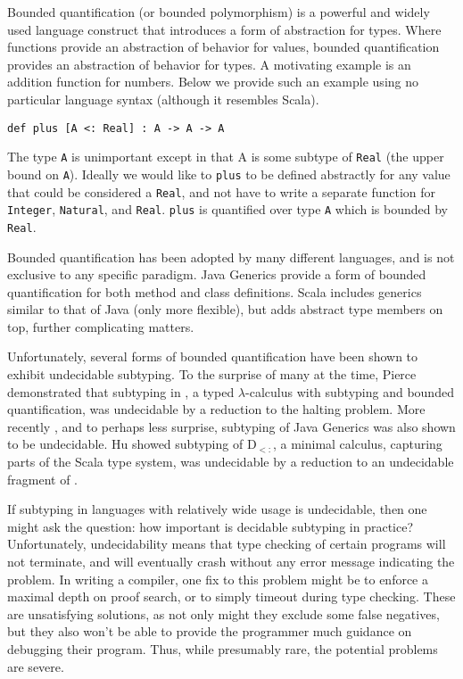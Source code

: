 \documentclass[runningheads]{llncs}
\begin{document}
Bounded quantification (or bounded polymorphism) is a powerful and widely used language construct that introduces a form of 
abstraction for types. Where functions provide an abstraction of behavior for values, bounded quantification 
provides an abstraction of behavior for types. A motivating example is an addition function for numbers. Below we
provide such an example using no particular language syntax (although it resembles Scala).
\begin{lstlisting}[mathescape, style=custom_lang]
def plus [A <: Real] : A -> A -> A
\end{lstlisting}
The type \verb|A| is unimportant except in that A is some subtype of \verb|Real| (the upper bound on \verb|A|). Ideally we would like to 
\verb|plus| to be defined abstractly for any value that could be considered a \verb|Real|, and not have to write 
a separate function for \verb|Integer|, \verb|Natural|, and \verb|Real|. \verb|plus| is  quantified over type \verb|A| which is 
bounded by \verb|Real|.

Bounded quantification has been adopted by many different languages, and is not exclusive to any specific paradigm.
Java Generics provide a form of bounded quantification for both method and class definitions.
Scala includes generics similar to that of Java (only more flexible), but adds abstract type members on top, further complicating matters.

Unfortunately, several forms of bounded quantification have been shown to exhibit undecidable subtyping.
To the surprise of many at the time, Pierce \cite{fsub popl 92} demonstrated that subtyping in \Fsub, a typed $\lambda$-calculus with subtyping and bounded quantification, 
was undecidable by a reduction to the halting problem.
More recently , and to perhaps less surprise, subtyping of Java Generics was also shown to be undecidable.
Hu \cite{jason and andreij} showed subtyping of D$_{<:}$, a minimal calculus, capturing parts of the Scala type system, was undecidable by a reduction to an undecidable fragment of \Fsub.

If subtyping in languages with relatively wide usage is undecidable, then one might ask the question: how important is decidable subtyping in practice?
Unfortunately, undecidability means that type checking of certain programs will not terminate, and will eventually crash without any error message indicating the problem.
In writing a compiler, one fix to this problem might be to enforce a maximal depth on proof search, or to simply timeout during type checking. These are unsatisfying 
solutions, as not only might they exclude some false negatives, but they also won't be able to provide the programmer much guidance on debugging their program.
Thus, while presumably rare, the potential problems are severe.
\end{document}
